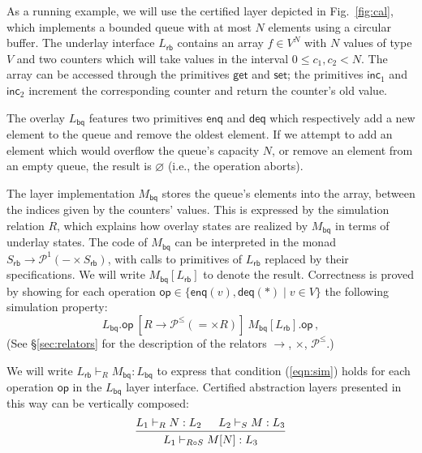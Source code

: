 \documentclass[draft,11pt]{report}
\newcommand{\kw}[1]{\ensuremath{ \mathsf{#1} }}
\begin{document}
As a running example,
we will use the certified layer
depicted in Fig.~\ref{fig:cal},
which implements a bounded queue with at most $N$ elements
using a circular buffer.
The underlay interface $L_\kw{rb}$
contains an array $f \in V^N$
with $N$ values of type $V$ and two counters
which will take values in the interval $0 \le c_1, c_2 < N$.
The array can be accessed through the primitives
$\kw{get}$ and $\kw{set}$;
the primitives $\kw{inc}_1$ and $\kw{inc}_2$
increment the corresponding counter
and return the counter's old value.

The overlay $L_\kw{bq}$ features two primitives
$\kw{enq}$ and $\kw{deq}$
which respectively add a new element to the queue
and remove the oldest element.
If we attempt to add an element
which would overflow the queue's capacity $N$,
or remove an element from an empty queue,
the result is $\varnothing$ (i.e., the operation aborts).


The layer implementation $M_\kw{bq}$ 
stores the queue's elements into the array,
between the indices given by the counters' values.
This is expressed by the simulation relation $R$,
which explains how overlay states are realized by $M_\kw{bq}$ 
in terms of underlay states.
%
The code of $M_\kw{bq}$ can be interpreted in the monad
$
    S_\kw{rb} \rightarrow \mathcal{P}^1(- \times S_\kw{rb})
$,
with calls to primitives of $L_\kw{rb}$
replaced by their specifications.
We will write $M_\kw{bq}[L_\kw{rb}]$ to denote the result.
Correctness is proved by showing
for each operation
$\kw{op} \in \{ \kw{enq}(v), \kw{deq}(*) \mid v \in V \}$
the following simulation property:
\begin{equation}
  \label{eqn:sim}
  L_\kw{bq}.\kw{op}
  \: \mathrel{[R \rightarrow \mathcal{P}^\le({=} \times R)]} \:
  M_\kw{bq}[L_\kw{rb}].\kw{op} \,,
\end{equation}
(See \S\ref{sec:relators} for the description of
the relators $\rightarrow$, $\times$, $\mathcal{P}^\le$.)

We will write $L_\kw{rb} \vdash_R M_\kw{bq} : L_\kw{bq}$
to express that condition (\ref{eqn:sim}) holds for
each operation $\kw{op}$ in the $L_\kw{bq}$ layer interface.
Certified abstraction layers presented in this way
can be vertically composed:
\[
  \begin{prooftree}
    \hypo{L_1 \vdash_R N : L_2}
    \hypo{L_2 \vdash_S M : L_3}
    \infer2{L_1 \vdash_{R \circ S} M[N] : L_3}
  \end{prooftree}
\]
\end{document}
